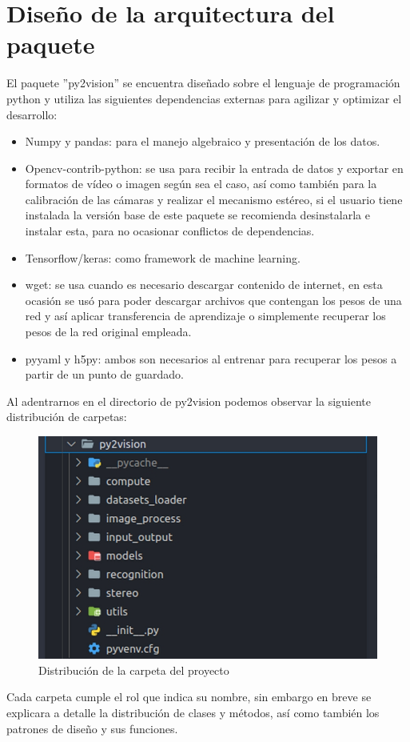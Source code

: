 \section{Diseño de la arquitectura del paquete}
El paquete ''py2vision'' se encuentra diseñado sobre el lenguaje de programación python y utiliza las siguientes dependencias externas para agilizar y optimizar el desarrollo:
\begin{itemize}
    \item Numpy y pandas: para el manejo algebraico y presentación de los datos.
    \item Opencv-contrib-python: se usa para recibir la entrada de datos y exportar en formatos de vídeo o imagen según sea el caso, así como también para la calibración de las cámaras y realizar el mecanismo estéreo, si el usuario tiene instalada la versión base de este paquete se recomienda desinstalarla e instalar esta, para no ocasionar conflictos de dependencias.
    \item Tensorflow/keras: como framework de machine learning.
    \item wget: se usa cuando es necesario descargar contenido de internet, en esta ocasión se usó para poder descargar archivos que contengan los pesos de una red y así aplicar transferencia de aprendizaje o simplemente recuperar los pesos de la red original empleada.
    \item pyyaml y h5py: ambos son necesarios al entrenar para recuperar los pesos a partir de un punto de guardado.
\end{itemize}
Al adentrarnos en el directorio de py2vision podemos observar la siguiente distribución de carpetas:
\begin{figure}[H]
    \centering
    \includegraphics[scale=0.4]{Recursos/pytwovision_folder.jpg}
    \caption{Distribución de la carpeta del proyecto}
    \label{pytwovision_folder}
\end{figure}
Cada carpeta cumple el rol que indica su nombre, sin embargo en breve se explicara a detalle la distribución de clases y métodos, así como también los patrones de diseño y sus funciones.
